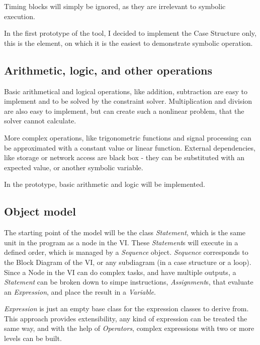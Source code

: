 Timing blocks will simply be ignored, as they are irrelevant to symbolic execution. 

In the first prototype of the tool, I decided to implement the Case Structure only, this is the element, on which it is the easiest to demonstrate symbolic operation. 
\subsection{Arithmetic, logic, and other operations}
Basic arithmetical and logical operations, like addition, subtraction are easy to implement and to be solved by the constraint solver. Multiplication and division are also easy to implement, but can create such a nonlinear problem, that the solver cannot calculate. 

More complex operations, like trigonometric functions and signal processing can be approximated with a constant value or linear function. External dependencies, like storage or network access are black box - they can be substituted with an expected value, or another symbolic variable.

In the prototype, basic arithmetic and logic will be implemented.

\subsection{Object model}

The starting point of the model will be the class \textit{Statement}, which is the same unit in the program as a node in the VI. These \textit{Statement}s will execute in a defined order, which is managed by a \textit{Sequence} object. \textit{Sequence} corresponds to the Block Diagram of the VI, or any subdiagram (in a case structure or a loop). Since a Node in the VI can do complex tasks, and have multiple outputs, a \textit{Statement} can be broken down to simpe instructions, \textit{Assignment}s, that evaluate an \textit{Expression}, and place the result in a \textit{Variable}.

\textit{Expression} is just an empty base class for the expression classes to derive from. This approach provides extensibility, any kind of expression can be treated the same way, and with the help of \textit{Operators}, complex expressions with two or more levels can be built.

